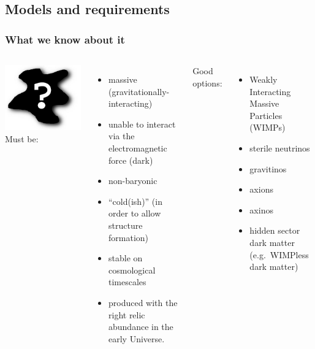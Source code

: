 \documentclass[xcolor=dvipsnames]{beamer}
\begin{document}
\subsection{Models and requirements}

\begin{frame}
  \frametitle{What we know about it}
  \begin{columns}[T]
	\includegraphics[width=\linewidth]{DM}
	\alert<1-2>{Must be:}
        \begin{itemize}
        \footnotesize
	\item massive (gravitationally-interacting)
        \item unable to interact via the electromagnetic force (dark)
        \item non-baryonic
        \item ``cold(ish)'' (in order to allow structure formation) 
        \item stable on cosmological timescales
        \item produced with the right relic abundance in the early Universe.\\\vspace{2mm}
	\end{itemize}
        \alert<1-2>{Good options:}
        \begin{itemize}
        \footnotesize
        \item \alert<3>{Weakly Interacting Massive Particles (WIMPs)}
        \item sterile neutrinos
        \item gravitinos
        \item axions
        \item axinos
        \item hidden sector dark matter (e.g.~WIMPless dark matter)
        \end{itemize}
  \end{columns}


\end{frame}
\end{document}
